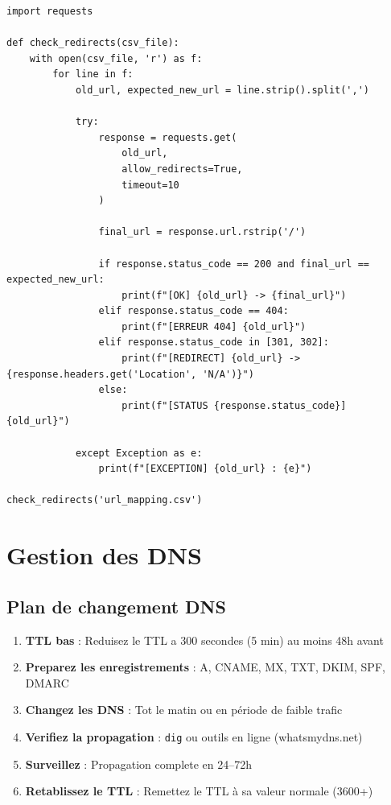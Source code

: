 \documentclass[12pt,a4paper,twoside]{report}
\begin{document}
\begin{lstlisting}[style=code,caption={Script de vérification des redirections avec Python}]
import requests

def check_redirects(csv_file):
    with open(csv_file, 'r') as f:
        for line in f:
            old_url, expected_new_url = line.strip().split(',')

            try:
                response = requests.get(
                    old_url,
                    allow_redirects=True,
                    timeout=10
                )

                final_url = response.url.rstrip('/')

                if response.status_code == 200 and final_url == expected_new_url:
                    print(f"[OK] {old_url} -> {final_url}")
                elif response.status_code == 404:
                    print(f"[ERREUR 404] {old_url}")
                elif response.status_code in [301, 302]:
                    print(f"[REDIRECT] {old_url} -> {response.headers.get('Location', 'N/A')}")
                else:
                    print(f"[STATUS {response.status_code}] {old_url}")

            except Exception as e:
                print(f"[EXCEPTION] {old_url} : {e}")

check_redirects('url_mapping.csv')
\end{lstlisting}

\section{Gestion des DNS}

\subsection{Plan de changement DNS}

\begin{enumerate}
    \item \textbf{TTL bas} : Reduisez le TTL a 300 secondes (5 min) au moins 48h avant
    \item \textbf{Preparez les enregistrements} : A, CNAME, MX, TXT, DKIM, SPF, DMARC
    \item \textbf{Changez les DNS} : Tot le matin ou en période de faible trafic
    \item \textbf{Verifiez la propagation} : \texttt{dig} ou outils en ligne (whatsmydns.net)
    \item \textbf{Surveillez} : Propagation complete en 24--72h
    \item \textbf{Retablissez le TTL} : Remettez le TTL à sa valeur normale (3600+)
\end{enumerate}
\end{document}
